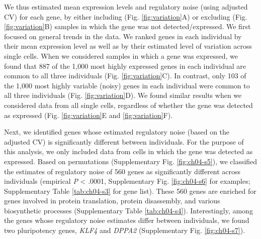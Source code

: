 We thus estimated mean expression levels and regulatory noise (using
adjusted CV) for each gene, by either including
(Fig. \ref{fig:variation}A) or excluding (Fig. \ref{fig:variation}B)
samples in which the gene was not detected/expressed. We first focused
on general trends in the data. We ranked genes in each individual by
their mean expression level as well as by their estimated level of
variation across single cells. When we considered samples in which a
gene was expressed, we found that 887 of the 1,000 most highly
expressed genes in each individual are common to all three individuals
(Fig. \ref{fig:variation}C). In contrast, only 103 of the 1,000 most
highly variable (noisy) genes in each individual were common to all
three individuals (Fig. \ref{fig:variation}D). We found similar
results when we considered data from all single cells, regardless of
whether the gene was detected as expressed (Fig. \ref{fig:variation}E
and \ref{fig:variation}F).

Next, we identified genes whose estimated regulatory noise (based on
the adjusted CV) is significantly different between individuals. For
the purpose of this analysis, we only included data from cells in
which the gene was detected as expressed. Based on permutations
(Supplementary Fig. \ref{fig:ch04-s5}), we classified the estimates of
regulatory noise of 560 genes as significantly different across
individuals (empirical \emph{P} \textless{} .0001, Supplementary
Fig. \ref{fig:ch04-s6} for examples; Supplementary Table
\ref{tab:ch04-s3} for gene list). These 560 genes are enriched for
genes involved in protein translation, protein disassembly, and
various biosynthetic processes (Supplementary Table
\ref{tab:ch04-s4}). Interestingly, among the genes whose regulatory
noise estimates differ between individuals, we found two pluripotency
genes, \emph{KLF4} and \emph{DPPA2} (Supplementary Fig.
\ref{fig:ch04-s7}).

